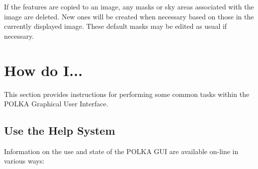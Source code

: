 \documentclass[11pt]{article}
\newcommand{\xlabel}[1]{}
\newcommand{\mylabel}[1] {\xlabel{#1}\label{#1}}
\begin{document}
If the features are copied to an image, any masks or sky areas associated
with the image are deleted. New ones will be created when necessary based
on those in the currently displayed image. These default masks may be
edited as usual if necessary.

\section {\mylabel{POLKA_HOW_DO_I}How do I...}
This section provides instructions for performing some common tasks
within the POLKA Graphical User Interface.

\subsection {\mylabel{POLKA_USING_HELP}Use the Help System}
Information on the use and state of the POLKA GUI are available on-line
in various ways:
\end{document}
